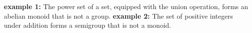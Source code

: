 \textbf{example 1:} The power set of a set, equipped with the union operation, forms an abelian monoid that is not a group.
\textbf{example 2:} The set of positive integers under addition forms a semigroup that is not a monoid.
